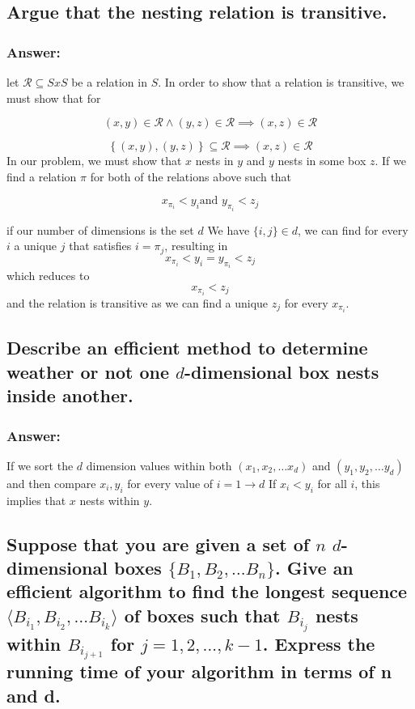 \documentclass[titlepage]{article}
\theoremstyle{definition}
\begin{document}
  \subsection{Argue that the nesting relation is transitive.}
    \subsubsection{Answer:}
      let $\mathcal R \subseteq S x S$ be a relation in $S$. 
      In order to show that a relation is transitive, we must show that  for

      \[ \left({x, y}\right) \in \mathcal R \land \left({y, z}\right) \in \mathcal R \implies \left({x, z}\right) \in \mathcal R \]

      \[ \left\{ {\left({x, y}\right), \left({y, z}\right)}\right\} \subseteq \mathcal R \implies \left({x, z}\right) \in \mathcal R \]
      In our problem, we must show that $x$ nests in $y$ and $y$ nests in some box
      $z$. If we find a relation $\pi$ for both of the relations above such that

      \[ x_{\pi_i} < y_i \text{and } y_{\pi_i} < z_j \]

      if our number of dimensions is the set $d$
      We have $ \{i,j\} \in d$, we can find for every $i$ a unique $j$ that satisfies
      $i = \pi_j$, resulting in 
      \[ x_{\pi_i} < y_i =  y_{\pi_i} < z_j \]
      which reduces to 
      \[ x_{\pi_i} < z_j \]
      and the relation is transitive as we can find a unique $z_j$ for every
      $x_{\pi_i}$.



  \subsection{Describe an efficient method to determine weather or not one
              $d$-dimensional box nests inside another.}
  \subsubsection{Answer:}
    If we sort the $d$ dimension values within both $(x_1, x_2, \dots x_d)$ and
    $(y_1, y_2, \dots y_d)$ and then compare $x_i, y_i$ for every value of $i =
    1 \to d$ If $x_i <y_i$ for all $i$, this implies that $x$ nests within $y$.
    
  \subsection{Suppose that you are given a set of $n$ $d$-dimensional boxes
        $\{B_1, B_2,\dots B_n\}$. Give an efficient algorithm to find the longest
        sequence $\langle B_{i_1}, B_{i_2},\dots B_{i_k}\rangle$ of boxes such that
        $B_{i_j}$ nests within  $B_{i_{j+1}}$ for $j = 1,2,\dots,k-1$. Express the
        running time of your algorithm in terms of n and d.}
\end{document}
